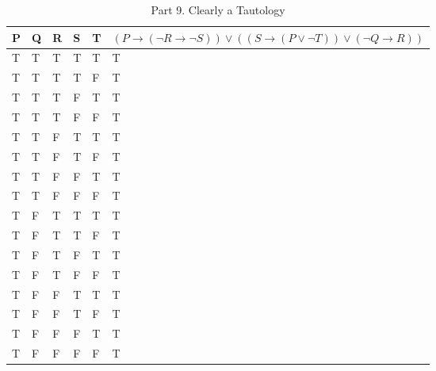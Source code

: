 \documentclass[10.5pt]{article}
\newenvironment{solution}[2][Solution]{ \begin{trivlist}
\item[\hskip \labelsep {\bfseries #1}]}{\end{trivlist}}
\begin{document}
\begin{solution}{2}
\begin{table}[!h]
\centering
\caption{Part 9. Clearly a Tautology}
\label{my-label}
\begin{tabular}{|l|l|l|l|l|l|}
\hline
P & Q & R & S & T & $(P \rightarrow (\lnot R \rightarrow \lnot S)) \vee ((S \rightarrow (P \vee \lnot T)) \vee (\lnot Q \rightarrow R))$ \\ \hline
T & T & T & T & T & T                                                                    \\ \hline
T & T & T & T & F & T                                                                    \\ \hline
T & T & T & F & T & T                                                                    \\ \hline
T & T & T & F & F & T                                                                    \\ \hline
T & T & F & T & T & T                                                                    \\ \hline
T & T & F & T & F & T                                                                    \\ \hline
T & T & F & F & T & T                                                                    \\ \hline
T & T & F & F & F & T                                                                    \\ \hline
T & F & T & T & T & T                                                                    \\ \hline
T & F & T & T & F & T                                                                    \\ \hline
T & F & T & F & T & T                                                                    \\ \hline
T & F & T & F & F & T                                                                    \\ \hline
T & F & F & T & T & T                                                                    \\ \hline
T & F & F & T & F & T                                                                    \\ \hline
T & F & F & F & T & T                                                                    \\ \hline
T & F & F & F & F & T                                                                    \\ \hline

\end{tabular}
\end{table}
\end{solution}
\end{document}

